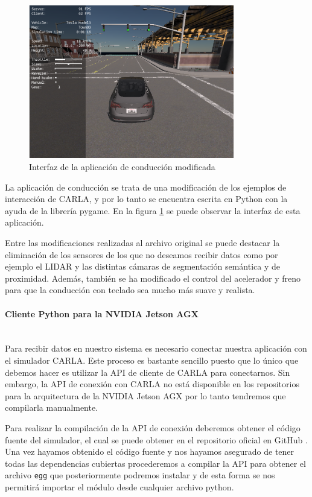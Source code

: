 \begin{figure}[h!]
    \centering
    \includegraphics[width=0.8\textwidth]{img/carlaConductor.png}
    \caption{Interfaz de la aplicación de conducción modificada}
    \label{fig:capturaCarlaConduccion}
\end{figure}

La aplicación de conducción se trata de una modificación de los ejemplos de interacción de CARLA, y por lo tanto se encuentra escrita en Python con la ayuda de la librería pygame. En la figura \ref{fig:capturaCarlaConduccion} se puede observar la interfaz de esta aplicación.

Entre las modificaciones realizadas al archivo original se puede destacar la eliminación de los sensores de los que no deseamos recibir datos como por ejemplo el LIDAR y las distintas cámaras de segmentación semántica y de proximidad. Además, también se ha modificado el control del acelerador y freno para que la conducción con teclado sea mucho más suave y realista.


\paragraph{Cliente Python para la NVIDIA Jetson AGX}\mbox{}\\
Para recibir datos en nuestro sistema es necesario conectar nuestra aplicación con el simulador CARLA. Este proceso es bastante sencillo puesto que lo único que debemos hacer es utilizar la API de cliente de CARLA para conectarnos.
Sin embargo, la API de conexión con CARLA no está disponible en los repositorios para la arquitectura de la NVIDIA Jetson AGX por lo tanto tendremos que compilarla manualmente.

Para realizar la compilación de la API de conexión deberemos obtener el código fuente del simulador, el cual se puede obtener en el repositorio oficial en GitHub \cite{repoCARLA}. Una vez hayamos obtenido el código fuente y nos hayamos asegurado de tener todas las dependencias cubiertas procederemos a compilar la API para obtener el archivo \texttt{egg} que posteriormente podremos instalar y de esta forma se nos permitirá importar el módulo  desde cualquier archivo python.


